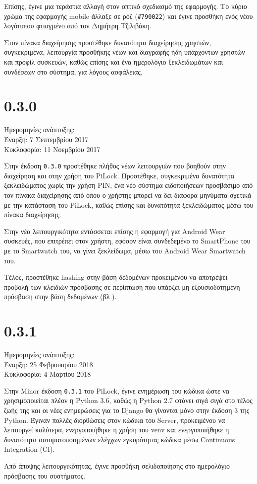 	Επίσης, έγινε μια τεράστια αλλαγή στον οπτικό σχεδιασμό της εφαρμογής. Το κύριο χρώμα της εφαρμογής mobile άλλαξε σε ρόζ (\verb|#790022|) και έγινε προσθήκη ενός νέου λογότυπου φτιαγμένο από τον Δημήτρη Τζιλιβάκη.

	Στον πίνακα διαχείρησης προστέθηκε δυνατότητα διαχείρησης χρηστών, συγκεκριμένα, λειτουργία προσθήκης νέων και διαγραφής ήδη υπάρχοντων χρηστών και προφίλ συσκευών, καθώς επίσης και ένα ημερολόγιο ξεκλειδωμάτων και συνδέσεων στο σύστημα, για λόγους ασφάλειας.  

\section{0.3.0}
	Ημερομηνίες ανάπτυξης:\\Έναρξη: 7 Σεπτεμβρίου 2017\\Κυκλοφορία: 11 Νοεμβρίου 2017

	Στην έκδοση \verb|0.3.0| προστέθηκε πλήθος νέων λειτουργιών που βοηθούν στην διαχείρηση και στην χρήση του PiLock. Προστέθηκε, συγκεκριμένα δυνατότητα ξεκλειδώματος χωρίς την χρήση PIN, ένα νέο σύστημα ειδοποιήσεων προσβάσιμο από τον πίνακα διαχείρησης από όπου ο χρήστης μπορεί να δει διάφορα μηνύματα σχετικά με την κατάσταση του PiLock, καθώς επίσης και δυνατότητα ξεκλειδώματος μέσω του πίνακα διαχείρησης.

	Στην νέα λειτουργικότητα εντάσσεται επίσης η εφαρμογή για Android Wear συσκευές, που επιτρέπει στον χρήστη, εφόσον είναι συνδεδεμένο το SmartPhone του με το Smartwatch του, να γίνει ξεκλείδωμα, μέσω του Android Wear Smartwatch του.

	Τέλος, προστέθηκε hashing στην βάση δεδομένων προκειμένου να αποτρέψει προβολή των κλειδιών πρόσβασης σε περίπτωση που υπάρξει μη εξουσιοδοτημένη πρόσβαση στην βάση δεδομένων (βλ ). 

\section{0.3.1}
	Ημερομηνίες ανάπτυξης:\\Έναρξη: 25 Φεβρουαρίου 2018\\Κυκλοφορία: 4 Μαρτίου 2018

	Στην Minor έκδοση \verb|0.3.1| του PiLock, έγινε ενημέρωση του κώδικα ώστε να χρησιμοποιείται πλέον η Python 3.6, καθώς η Python 2.7 φτάνει σιγά σιγά στο τέλος ζωής της και οι νέες ενημερώσεις για το Django θα γίνονται μόνο στην έκδοση 3 της Python. Έγιναν πολλές διορθώσεις στον κώδικα του Server, προκειμένου να λειτουργεί καλύτερα, ενεργοποιήθηκε η χρήση του venv και ενεργοποιήθηκε η δυνατότητα αυτοματοποιημένων ελέγχων εγκυρότητας κώδικα μέσω Continuous Integration (CI).

	Από άποψης λειτουργικότητας, έγινε προσθήκη σελιδοποίησης στο ημερολόγιο πρόσβασης του συστήματος.